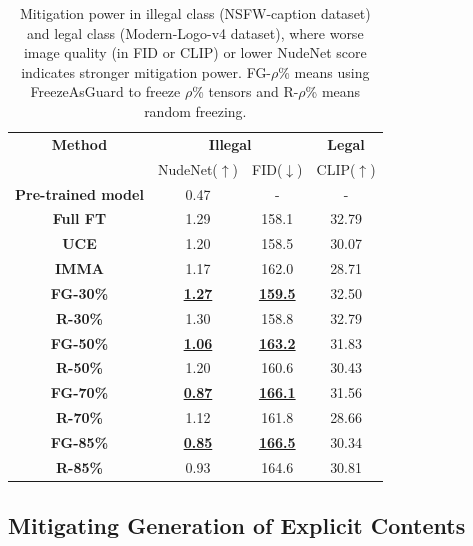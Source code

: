 \documentclass{article}
\begin{document}
\begin{table}[ht]
	\centering
	{\fontsize{9}{9}\selectfont
		\begin{tabular}{cccc}
			\toprule
			\textbf{Method} &\multicolumn{2}{c}{\textbf{Illegal}} & \textbf{Legal}\\ \cmidrule(ll){2-3}\cmidrule(ll){4-4}
			& NudeNet($\uparrow$) & FID($\downarrow$) & CLIP($\uparrow$)\\ \midrule
			\textbf{Pre-trained model}& 0.47 & - & - \\ \midrule[1pt]
			\textbf{Full FT}& 1.29& 158.1 &32.79 \\ \midrule[1pt]
			\textbf{UCE}&1.20& 158.5& 30.07 \\ \midrule[1pt]
			\textbf{IMMA}&1.17& 162.0& 28.71 \\ \midrule[1pt]
			\textbf{FG-30\%}&\textbf{\underline{1.27}}&\textbf{\underline{159.5}}&32.50\\ \midrule[1pt]
			\textbf{R-30\%}&1.30&158.8&32.79\\ \midrule
			\textbf{FG-50\%}&\textbf{\underline{1.06}}&\textbf{\underline{163.2}}&31.83\\ \midrule[1pt]
			\textbf{R-50\%}&1.20&160.6&30.43\\ \midrule
			\textbf{FG-70\%}&\textbf{\underline{0.87}}&\textbf{\underline{166.1}}&31.56\\ \midrule[1pt]
			\textbf{R-70\%}&1.12&161.8&28.66\\ \midrule
			\textbf{FG-85\%}&\textbf{\underline{0.85}}&\textbf{\underline{166.5}}&30.34\\ \midrule[1pt]
			\textbf{R-85\%}&0.93&164.6&30.81\\ 
			\bottomrule
	\end{tabular}}
	\vspace{0.1in}
	\caption{Mitigation power in illegal class (NSFW-caption dataset) and legal class (Modern-Logo-v4 dataset), where worse image quality (in FID or CLIP) or lower NudeNet score indicates stronger mitigation power. FG-$\rho$\% means using FreezeAsGuard to freeze $\rho$\% tensors and R-$\rho$\% means random freezing.}
	\label{tab:explicit}
\end{table}


\subsection{Mitigating Generation of Explicit Contents}
\end{document}
